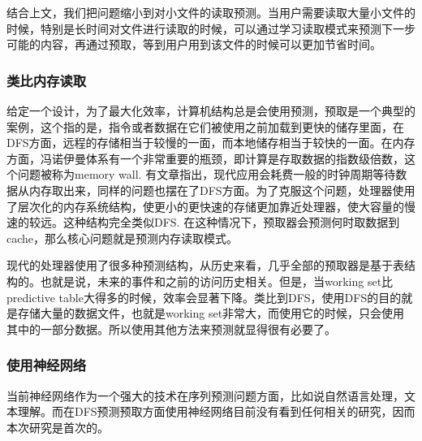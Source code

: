 \documentclass[UTF8]{ctexart}
\begin{document}
结合上文，我们把问题缩小到对小文件的读取预测。当用户需要读取大量小文件的时候，特别是长时间对文件进行读取的时候，可以通过学习读取模式来预测下一步可能的内容，再通过预取，等到用户用到该文件的时候可以更加节省时间。

\subsubsection{类比内存读取}
给定一个设计，为了最大化效率，计算机结构总是会使用预测，预取是一个典型的案例，这个指的是，指令或者数据在它们被使用之前加载到更快的储存里面，在DFS方面，远程的存储相当于较慢的一面，而本地储存相当于较快的一面。在内存方面，冯诺伊曼体系有一个非常重要的瓶颈，即计算是存取数据的指数级倍数，这个问题被称为memory wall. 有文章指出，现代应用会耗费一般的时钟周期等待数据从内存取出来，同样的问题也摆在了DFS方面。为了克服这个问题，处理器使用了层次化的内存系统结构，使更小的更快速的存储更加靠近处理器，使大容量的慢速的较远。这种结构完全类似DFS. 在这种情况下，预取器会预测何时取数据到cache，那么核心问题就是预测内存读取模式。

现代的处理器使用了很多种预测结构，从历史来看，几乎全部的预取器是基于表结构的。也就是说，未来的事件和之前的访问历史相关。但是，当working set比predictive table大得多的时候，效率会显著下降。类比到DFS，使用DFS的目的就是存储大量的数据文件，也就是working set非常大，而使用它的时候，只会使用其中的一部分数据。所以使用其他方法来预测就显得很有必要了。

\subsubsection{使用神经网络}
当前神经网络作为一个强大的技术在序列预测问题方面，比如说自然语言处理，文本理解。而在DFS预测预取方面使用神经网络目前没有看到任何相关的研究，因而本次研究是首次的。
\end{document}
